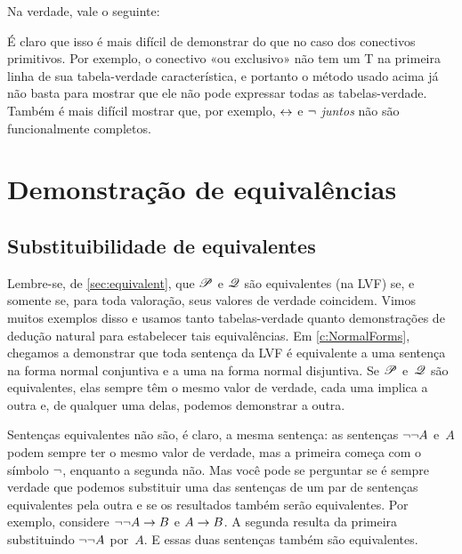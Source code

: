 Na verdade, vale o seguinte:


É claro que isso é mais difícil de demonstrar do que no caso dos conectivos primitivos. Por exemplo, o conectivo «ou exclusivo» não tem um T na primeira linha de sua tabela-verdade característica, e portanto o método usado acima já não basta para mostrar que ele não pode expressar todas as tabelas-verdade. Também é mais difícil mostrar que, por exemplo, $\leftrightarrow$ e $\neg$ \emph{juntos} não são funcionalmente completos.

\chapter{Demonstração de equivalências}\label{ch:equivalences}

\section{Substituibilidade de equivalentes}

Lembre-se, de \cref{sec:equivalent}, que $\mathscr{P}$ e $\mathscr{Q}$ são equivalentes (na LVF) se, e somente se, para toda valoração, seus valores de verdade coincidem. Vimos muitos exemplos disso e usamos tanto tabelas-verdade quanto demonstrações de dedução natural para estabelecer tais equivalências. Em \cref{c:NormalForms}, chegamos a demonstrar que toda sentença da LVF é equivalente a uma sentença na forma normal conjuntiva e a uma na forma normal disjuntiva. Se $\mathscr{P}$ e~$\mathscr{Q}$ são equivalentes, elas sempre têm o mesmo valor de verdade, cada uma implica a outra e, de qualquer uma delas, podemos demonstrar a outra.

Sentenças equivalentes não são, é claro, a mesma sentença: as sentenças $\neg\neg A$ e~$A$ podem sempre ter o mesmo valor de verdade, mas a primeira começa com o símbolo $\neg$, enquanto a segunda não. Mas você pode se perguntar se é sempre verdade que podemos substituir uma das sentenças de um par de sentenças equivalentes pela outra e se os resultados também serão equivalentes. Por exemplo, considere $\neg\neg A \rightarrow B$ e $A \rightarrow B$. A segunda resulta da primeira substituindo $\neg\neg A$ por~$A$. E essas duas sentenças também são equivalentes.

